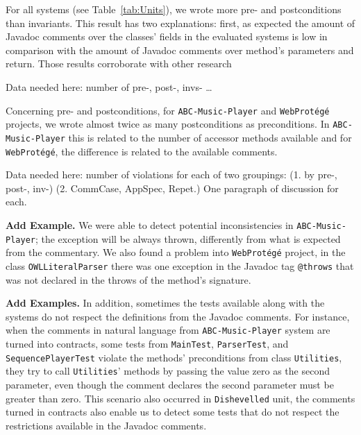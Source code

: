 For all systems (see Table~\ref{tab:Units}), we
wrote more pre- and postconditions than invariants. This result has two
explanations: first, as expected the amount of Javadoc comments over the
classes' fields in the evaluated systems is low in comparison with the amount
of Javadoc comments over method's parameters and return.
Those results corroborate with other research~\cite{} 



Data needed here: number of pre-, post-, invs- \ldots

Concerning pre- and postconditions, for \texttt{ABC-Music-Player} and
\texttt{WebProt\'{e}g\'{e}} projects, we wrote almost twice as many postconditions
as preconditions.
In \texttt{ABC-Music-Player} this is related to the number of accessor methods
available and for \texttt{WebProt\'{e}g\'{e}}, the difference is related to
the available comments.



%


Data needed here: number of violations for each of two groupings:
(1. by pre-, post-, inv-)
(2. CommCase, AppSpec, Repet.)
One paragraph of discussion for each.



\textbf{Add Example. }
We were able to detect potential inconsistencies in \texttt{ABC-Mu\-sic-Player};
the exception will be always thrown, differently from what is expected from the
commentary.
We also found a problem into
\texttt{WebProt\'{e}g\'{e}} project, in the class \texttt{OWLLiteralParser} there was one exception
in the Javadoc tag \texttt{@throws} that was not declared in the throws of the method's signature.

\textbf{Add Examples. }
In addition, sometimes the tests available along with the systems do
not respect the definitions from the Javadoc comments. For instance, when the
comments in natural language from \texttt{ABC-Music-Player} system are turned into
\contractjdoc{} contracts, some tests from
\texttt{MainTest}, \texttt{ParserTest}, and \texttt{SequencePlayerTest} violate
the methods' preconditions from class \texttt{Utilities}, they try to
call \texttt{Utilities}' methods by passing the value zero as the second
parameter, even though the comment declares the second parameter must be greater than zero.
This scenario also occurred in \texttt{Dishevelled} unit, the comments turned
in \contractjdoc{} contracts also enable us to detect some tests
that do not respect the restrictions available in the Javadoc comments.


